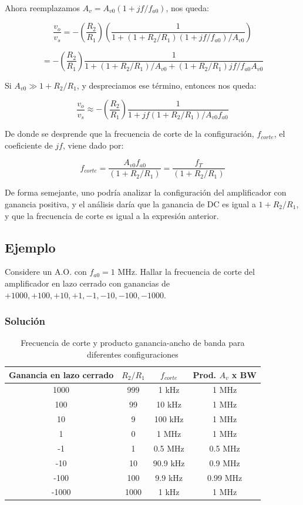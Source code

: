 Ahora reemplazamos \( A_v = A_{v0} (1 + j f / f_{a0}) \), nos queda:

\[
\frac{v_o}{v_s} = -\left(\frac{R_2}{R_1}\right) \left( \frac{1}{1 + (1 + R_2/R_1)(1 + j f / f_{a0}) / A_{v0}} \right)
\]

\[
= -\left(\frac{R_2}{R_1}\right) \frac{1}{1 + (1 + R_2/R_1)/A_{v0} + (1 + R_2/R_1) j f / f_{a0} A_{v0}}
\]

Si \( A_{v0} \gg 1 + R_2 / R_1 \), y despreciamos ese término, entonces nos queda:

\[
\frac{v_o}{v_s} \approx -\left(\frac{R_2}{R_1}\right) \frac{1}{1 + j f (1 + R_2/R_1) / A_{v0} f_{a0}}
\]

De donde se desprende que la frecuencia de corte de la configuración, \( f_{corte} \), el coeficiente de \( j f \), viene dado por:

\[
f_{corte} = \frac{A_{v0} f_{a0}}{(1 + R_2 / R_1)} = \frac{f_T}{(1 + R_2 / R_1)}
\]

De forma semejante, uno podría analizar la configuración del amplificador con ganancia positiva, y el análisis daría que la ganancia de DC es igual a \( 1 + R_2/R_1 \), y que la frecuencia de corte es igual a la expresión anterior.

\subsection{Ejemplo}

Considere un A.O. con \( f_{a0} = 1 \) MHz. Hallar la frecuencia de corte del amplificador en lazo cerrado con ganancias de \( +1000, +100, +10, +1, -1, -10, -100, -1000 \).

\subsubsection{Solución}

\begin{table}[h]
	\centering
	\begin{tabular}{|c|c|c|c|}
		\hline
		\textbf{Ganancia en lazo cerrado} & \( R_2 / R_1 \) & \( f_{corte} \) & \textbf{Prod. \( A_v \) x BW} \\
		\hline
		1000  & 999  & 1 kHz   & 1 MHz  \\
		100   & 99   & 10 kHz  & 1 MHz  \\
		10    & 9    & 100 kHz & 1 MHz  \\
		1     & 0    & 1 MHz   & 1 MHz  \\
		-1    & 1    & 0.5 MHz & 0.5 MHz \\
		-10   & 10   & 90.9 kHz & 0.9 MHz \\
		-100  & 100  & 9.9 kHz & 0.99 MHz \\
		-1000 & 1000 & 1 kHz   & 1 MHz  \\
		\hline
	\end{tabular}
	\caption{Frecuencia de corte y producto ganancia-ancho de banda para diferentes configuraciones}
\end{table}

